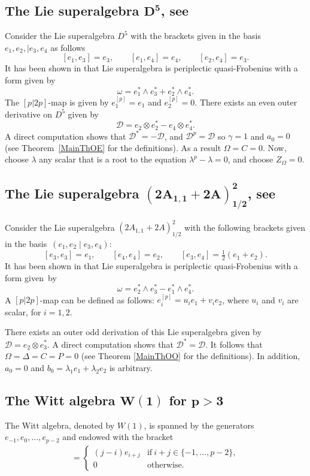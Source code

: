 \documentclass[pdftex]{sigma}
\numberwithin{equation}{section}
\begin{document}
\subsection[The Lie superalgebra D\^{}5, see \protect{[2]}]{The Lie superalgebra $\boldsymbol{D^5}$, see \cite{Ba}}
Consider the Lie superalgebra $D^5$ with the brackets given in the basis $e_1, e_2, \mid e_3, e_4$ as follows
\[
[e_1, e_3]=e_3, \qquad [e_1, e_4]=e_4, \qquad [e_2, e_4]=e_3.
\]
It has been shown in \cite{BM} that Lie superalgebra is periplectic quasi-Frobenius with a form given by
\[
\omega=e_1^*\wedge e_3^*+e_2^*\wedge e_4^*.
\]
The $[p|2p]$-map is given by $
e_1^{[p]}=e_1$ and $e_2^{[p]}=0$. There exists an even outer derivative on $D^5$ given by
\[
{\mathscr D}=e_2\otimes e_2^*-e_4\otimes e_4^*.
\]
A direct computation shows that ${\mathscr D}^*=-{\mathscr D}$, and ${\mathscr D}^p={\mathscr D}$ so $\gamma=1$ and $a_0=0$ (see Theorem~\ref{MainThOE} for the definitions). As a result $\Omega=C=0$. Now, choose $\lambda$ any scalar that is a root to the equation $\lambda^p-\lambda=0$, and choose $Z_\Omega= 0$.
\subsection[The Lie superalgebra (2A\_\{1,1\}+2A)\^{}2\_\{1/2\}, see \protect{[2]}]{The Lie superalgebra $\boldsymbol{(2A_{1,1}+2A)^2_{1/2}}$, see \cite{Ba}}
Consider the Lie superalgebra $(2A_{1,1}+2A)^2_{1/2}$ with the following brackets given in the basis~$(e_1, e_2 \mid e_3, e_4)$:
\[
[e_3, e_3]=e_1, \qquad [e_4, e_4]=e_2, \qquad [e_3, e_4]=\tfrac{1}{2}(e_1+e_2).
\]
It has been shown in \cite{BM} that Lie superalgebra is periplectic quasi-Frobenius with a form given~by
\[
\omega=e_2^*\wedge e_3^*-e_1^*\wedge e_4^*.
\]
A $[p|2p]$-map can be defined as follows: $e_i^{[p]}=u_{i} e_1 + v_{i} e_2$, where $u_i$ and $v_i$ are scalar, for $i=1,2$.

There exists an outer odd derivation of this Lie superalgebra given by ${\mathscr D}=e_2\otimes e_3^*$. A direct computation shows that ${\mathscr D}^*={\mathscr D}$. It follows that $\Omega = \Delta= C=P=0$ (see Theorem \ref{MainThOO} for the definitions). In addition, $a_0=0$ and $b_0=\lambda_1 e_1+\lambda_2 e_2$ is arbitrary.

\subsection[The Witt algebra W(1) for p>3]{The Witt algebra $\boldsymbol{W(1)}$ for $\boldsymbol{p>3}$}
The Witt algebra, denoted by $W(1)$, is spanned by the generators $e_{-1},e_0,\dots ,e_{p-2}$ and endowed with the bracket
\begin{gather*}	
[e_i,e_j]=
 \begin{cases}
		(j-i)e_{i+j} &\text{if}\ i+j\in\{-1,\dots ,p-2\},\\
		0 &\text{otherwise.}
	\end{cases}
\end{gather*}
	
\end{document}
